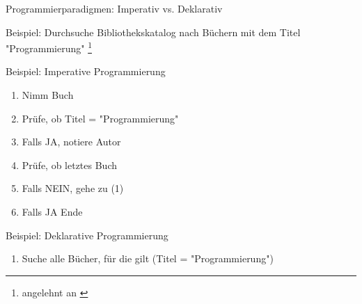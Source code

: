             \begin{frame}{Programmierparadigmen: Imperativ vs. Deklarativ}
            
                Beispiel: Durchsuche Bibliothekskatalog nach Büchern mit dem Titel "Programmierung" \footnote{angelehnt an \cite{leimeister}}
                
                \begin{exampleblock}{Beispiel: Imperative Programmierung}
                    \begin{enumerate}
                        \item Nimm Buch
                        \item Prüfe, ob Titel = "Programmierung"
                        \item Falls JA, notiere Autor
                        \item Prüfe, ob letztes Buch
                        \item Falls NEIN, gehe zu (1)
                        \item Falls JA \textrightarrow Ende
                    \end{enumerate}
                \end{exampleblock}
                
                \begin{exampleblock}{Beispiel: Deklarative Programmierung}
                    \begin{enumerate}
                        \item Suche alle Bücher, für die gilt (Titel = "Programmierung")
                    \end{enumerate}
                \end{exampleblock}
            \end{frame}
        
